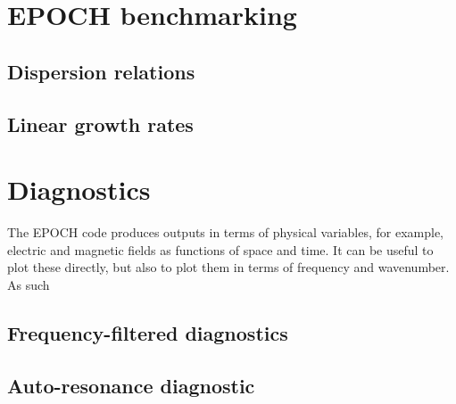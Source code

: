 \section{EPOCH benchmarking}
\subsection{Dispersion relations}
\subsection{Linear growth rates}



\section{Diagnostics}

The EPOCH code produces outputs in terms of physical variables, for example, electric and magnetic fields as functions of space and time. It can be useful to plot these directly, but also to plot them in terms of frequency and wavenumber. As such

\subsection{Frequency-filtered diagnostics}

\subsection{Auto-resonance diagnostic}

